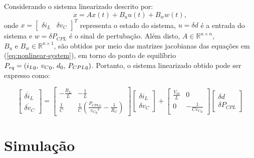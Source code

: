 Considerando o sistema linearizado descrito por: \begin{equation} \dot{x} = Ax(t) + B_uu(t) + B_ww(t), \end{equation} onde  $x = \begin{bmatrix} \delta i_L & \delta v_C \end{bmatrix} ^ T$ representa o estado do sistema, $u = \delta d$ é a entrada do sistema e $w = \delta P_{CPL}$ é o sinal de pertubação. Além disto, $A \in \mathbb{R}^{n \times n}$, $B_u \text{ e } B_w \in \mathbb{R}^{n \times 1}$, são obtidos por meio das matrizes jacobianas das equações em (\ref{eq:nonlinear-system}), em torno do ponto de equilíbrio $P_{eq} = ({i_L}_0, \hspace{0.07cm} {v_C}_0, \hspace{0.07cm} {d}_0, \hspace{0.07cm} {P_{CPL}}_0)$. Portanto, o sistema linearizado obtido pode ser expresso como:

\begin{equation}
  \begin{bmatrix}
    \dot{\delta i_L} \\ \dot{\delta v_C}
  \end{bmatrix}
  =
  \begin{bmatrix}
    -\frac{R_L}{L} & -\frac{1}{L}                                                                \\
    \frac{1}{C}    & \frac{1}{C}\left(\frac{{P_{CPL}}_0}{{{{v_{C}}_0}^2}} - \frac{1}{R_C}\right)
  \end{bmatrix}
  \begin{bmatrix}
    \delta i_L \\ \delta v_C
  \end{bmatrix}
  +
  \begin{bmatrix}
    {\frac{V_{in}}{L}} & 0                     \\
    0                  & {-\frac{1}{C{v_C}_0}}
  \end{bmatrix}
  \begin{bmatrix}
    \delta d \\ \delta P_{CPL}
  \end{bmatrix}
\end{equation}

\section{Simulação}
